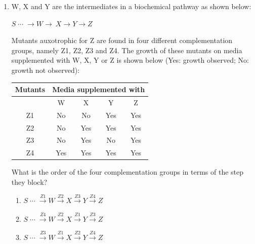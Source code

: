 \documentclass[journal,12pt,onecolumn]{IEEEtran}
\theoremstyle{remark}
\begin{document}
\begin{enumerate}[label=Q\arabic*:, start=26, leftmargin=2em]
\begin{multicols}{2}
\begin{enumerate}[label=\alph*)]
\item P and R only
\item P and S only
\item P, Q and R only
\item Q and R only

\end{enumerate}
\end{multicols}\hfill(GATE BT 2020)

\item W, X and Y are the intermediates in a biochemical pathway as shown below:\\
\begin{center}
$S{\;\cdots\;}\longrightarrow W\longrightarrow\ X\longrightarrow Y\longrightarrow
Z$\\
\end{center}
Mutants auxotrophic for Z are found in four different complementation groups, namely Z1, Z2, Z3 and Z4. The growth of these mutants on media supplemented with W, X, Y or Z is shown below (Yes: growth observed; No: growth not observed):
\begin{center}
\begin{tabular}{|c|c|c|c|c|}
\hline
\textbf{Mutants} & \multicolumn{4}{c|}{\textbf{Media supplemented with}} \\
\hline
 & W & X & Y & Z \\
\hline
Z1 & No & No & Yes & Yes \\
\hline
Z2 & No & Yes & Yes & Yes \\
\hline
Z3 & No & Yes & No & Yes \\
\hline
Z4 & Yes & Yes & Yes & Yes \\
\hline
\end{tabular}
\end{center}
What is the order of the four complementation groups in terms of the step they
block?\\
\begin{multicols}{2}
\begin{enumerate}[label=\alph*)]
\item $S{\;\cdots\;}\xrightarrow{Z1} W\xrightarrow{Z2} X\xrightarrow{Z3}Y\xrightarrow{Z4}Z$\\

\item $S{\;\cdots\;}\xrightarrow{Z4} W\xrightarrow{Z2} X\xrightarrow{Z1}Y\xrightarrow{Z3}Z$\\

\item $S{\;\cdots\;}\xrightarrow{Z3} W\xrightarrow{Z1} X\xrightarrow{Z2}Y\xrightarrow{Z4}Z$\\


\end{enumerate}
\end{multicols}
\end{enumerate}
\end{document}
